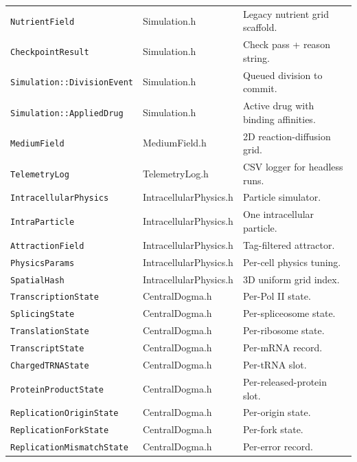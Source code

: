 \documentclass[11pt,letterpaper,twoside,openany]{book}
\newcommand{\code}[1]{\texttt{#1}}
\begin{document}
\begin{longtable}{p{4.4cm}p{3.0cm}p{7.0cm}}
\code{NutrientField}      & Simulation.h                        & Legacy nutrient grid scaffold.\\
\code{CheckpointResult}   & Simulation.h                        & Check pass + reason string.\\
\code{Simulation::DivisionEvent} & Simulation.h                & Queued division to commit.\\
\code{Simulation::AppliedDrug} & Simulation.h                  & Active drug with binding affinities.\\
\code{MediumField}        & MediumField.h                       & 2D reaction-diffusion grid.\\
\code{TelemetryLog}       & TelemetryLog.h                      & CSV logger for headless runs.\\
\code{IntracellularPhysics}& IntracellularPhysics.h             & Particle simulator.\\
\code{IntraParticle}      & IntracellularPhysics.h              & One intracellular particle.\\
\code{AttractionField}    & IntracellularPhysics.h              & Tag-filtered attractor.\\
\code{PhysicsParams}      & IntracellularPhysics.h              & Per-cell physics tuning.\\
\code{SpatialHash}        & IntracellularPhysics.h              & 3D uniform grid index.\\
\code{TranscriptionState} & CentralDogma.h                      & Per-Pol II state.\\
\code{SplicingState}      & CentralDogma.h                      & Per-spliceosome state.\\
\code{TranslationState}   & CentralDogma.h                      & Per-ribosome state.\\
\code{TranscriptState}    & CentralDogma.h                      & Per-mRNA record.\\
\code{ChargedTRNAState}   & CentralDogma.h                      & Per-tRNA slot.\\
\code{ProteinProductState}& CentralDogma.h                      & Per-released-protein slot.\\
\code{ReplicationOriginState}&CentralDogma.h                    & Per-origin state.\\
\code{ReplicationForkState}&CentralDogma.h                      & Per-fork state.\\
\code{ReplicationMismatchState}&CentralDogma.h                  & Per-error record.\\

\end{longtable}
\end{document}
